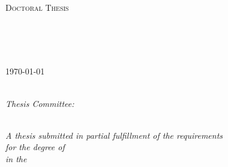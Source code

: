 



\frontmatter %

\pagestyle{plain} %


\begin{titlepage}
\begin{center}

\vspace*{.06\textheight}
\textsc{\Large Doctoral Thesis}\\[0.5cm] %

\HRule \\[0.4cm] %
{\huge \bfseries \ttitle\par}\vspace{0.4cm} %
\HRule \\[1.5cm] %
 
\begin{minipage}[t]{0.4\textwidth}
\centering
\Large{\authorname}\\ %
{\large \today}\\ %
\end{minipage}\\[4cm]
\emph{Thesis Committee:}\\
{\examname} \\[3cm]
\vfill

\large \textit{A thesis submitted in partial fulfillment of the requirements\\ for the degree of \degreename}\\[0.3cm] %
\textit{in the}\\[0.4cm]
\groupname\\\deptname\\[2cm] %
 

\end{center}
\end{titlepage}

